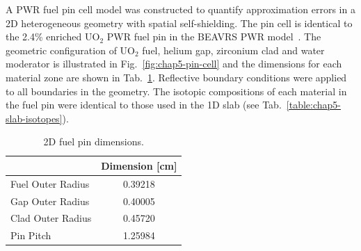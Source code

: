 A \ac{PWR} fuel pin cell model was constructed to quantify approximation errors in a 2D heterogeneous geometry with spatial self-shielding. The pin cell is identical to the 2.4\% enriched UO$_2$ \ac{PWR} fuel pin in the \ac{BEAVRS} \ac{PWR} model~\cite{horelik2013beavrs}. The geometric configuration of UO$_2$ fuel, helium gap, zirconium clad and water moderator is illustrated in Fig.~\ref{fig:chap5-pin-cell} and the dimensions for each material zone are shown in Tab.~\ref{table:chap5-pin-dimensions}. Reflective boundary conditions were applied to all boundaries in the geometry. The isotopic compositions of each material in the fuel pin were identical to those used in the 1D slab (see Tab.~\ref{table:chap5-slab-isotopes}). 

\begin{table}[H]
  \centering
  \caption[2D fuel pin dimensions]{2D fuel pin dimensions.}
  \label{table:chap5-pin-dimensions} 
  \vspace{6pt}
  \begin{tabular}{l c}
  \toprule
  \rowcolor{lightgray}
  \multicolumn{1}{c}{\cellcolor{lightgray} {\bf Material}} &
  {\bf Dimension [cm]} \\
  \midrule
  Fuel Outer Radius &     0.39218 \\
  Gap Outer Radius &      0.40005 \\
  Clad Outer Radius &     0.45720 \\
  Pin Pitch &             1.25984 \\
  \bottomrule
\end{tabular}
\end{table}

